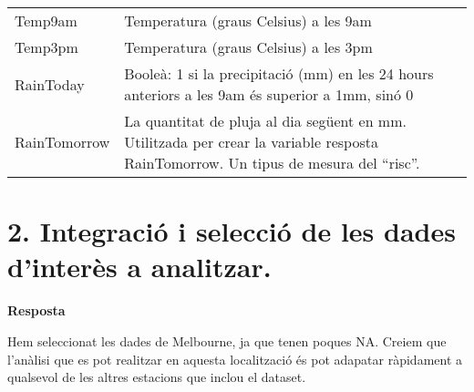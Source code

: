 \documentclass[
]{article}
\begin{document}
\begin{longtable}[]{@{}ll@{}}
\begin{minipage}[t]{0.19\columnwidth}
Temp9am\strut
\end{minipage} & \begin{minipage}[t]{0.75\columnwidth}\raggedright
Temperatura (graus Celsius) a les 9am\strut
\end{minipage}\tabularnewline
\begin{minipage}[t]{0.19\columnwidth}\raggedright
Temp3pm\strut
\end{minipage} & \begin{minipage}[t]{0.75\columnwidth}\raggedright
Temperatura (graus Celsius) a les 3pm\strut
\end{minipage}\tabularnewline
\begin{minipage}[t]{0.19\columnwidth}\raggedright
RainToday\strut
\end{minipage} & \begin{minipage}[t]{0.75\columnwidth}\raggedright
Booleà: 1 si la precipitació (mm) en les 24 hours anteriors a les 9am és
superior a 1mm, sinó 0\strut
\end{minipage}\tabularnewline
\begin{minipage}[t]{0.19\columnwidth}\raggedright
RainTomorrow\strut
\end{minipage} & \begin{minipage}[t]{0.75\columnwidth}\raggedright
La quantitat de pluja al dia següent en mm. Utilitzada per crear la
variable resposta RainTomorrow. Un tipus de mesura del ``risc''.\strut
\end{minipage}\tabularnewline
\bottomrule
\end{longtable}

\hypertarget{integraciuxf3-i-selecciuxf3-de-les-dades-dinteruxe8s-a-analitzar.}{%
\section{2. Integració i selecció de les dades d'interès a
analitzar.}\label{integraciuxf3-i-selecciuxf3-de-les-dades-dinteruxe8s-a-analitzar.}}

\textbf{Resposta}

Hem seleccionat les dades de Melbourne, ja que tenen poques NA. Creiem
que l'anàlisi que es pot realitzar en aquesta localització és pot
adapatar ràpidament a qualsevol de les altres estacions que inclou el
dataset.
\end{document}
